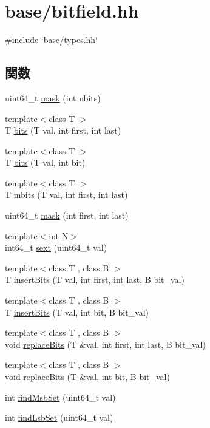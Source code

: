 \hypertarget{bitfield_8hh}{
\section{base/bitfield.hh}
\label{bitfield_8hh}
}
{\ttfamily \#include \char`\"{}base/types.hh\char`\"{}}\par
\subsection*{関数}
\begin{DoxyCompactItemize}
\item 
uint64\_\-t \hyperlink{bitfield_8hh_a8c8532a71d351341a5f90d44e4b40c64}{mask} (int nbits)
\item 
{\footnotesize template$<$class T $>$ }\\T \hyperlink{bitfield_8hh_a4ee0dc0723e11679c52429d5f8e05123}{bits} (T val, int first, int last)
\item 
{\footnotesize template$<$class T $>$ }\\T \hyperlink{bitfield_8hh_aabcb6224f8edd34a75739bf5df0e75fb}{bits} (T val, int bit)
\item 
{\footnotesize template$<$class T $>$ }\\T \hyperlink{bitfield_8hh_acaa3c424fec3407f14a01fe1ec22c2d4}{mbits} (T val, int first, int last)
\item 
uint64\_\-t \hyperlink{bitfield_8hh_abf6e0f9b301b3adfd6698a71071d96ba}{mask} (int first, int last)
\item 
{\footnotesize template$<$int N$>$ }\\int64\_\-t \hyperlink{bitfield_8hh_af08692f68db7334df1b150e57ef92c9f}{sext} (uint64\_\-t val)
\item 
{\footnotesize template$<$class T , class B $>$ }\\T \hyperlink{bitfield_8hh_a2aa7004e37a8c54bf3e5ce81c3125075}{insertBits} (T val, int first, int last, B bit\_\-val)
\item 
{\footnotesize template$<$class T , class B $>$ }\\T \hyperlink{bitfield_8hh_a6b2467118ee42515d4fbaee66ddb72c2}{insertBits} (T val, int bit, B bit\_\-val)
\item 
{\footnotesize template$<$class T , class B $>$ }\\void \hyperlink{bitfield_8hh_a00870999cf02f3961e51279ceb09d1bc}{replaceBits} (T \&val, int first, int last, B bit\_\-val)
\item 
{\footnotesize template$<$class T , class B $>$ }\\void \hyperlink{bitfield_8hh_a25693bbb200981ae04c9607cab995223}{replaceBits} (T \&val, int bit, B bit\_\-val)
\item 
int \hyperlink{bitfield_8hh_aa8f1ff3b89ba9c337baeef12d161580f}{findMsbSet} (uint64\_\-t val)
\item 
int \hyperlink{bitfield_8hh_a224a4f55757322870a3fa87b5d5254ee}{findLsbSet} (uint64\_\-t val)
\end{DoxyCompactItemize}


